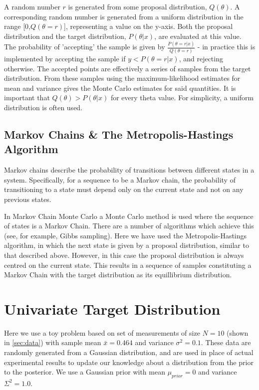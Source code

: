 \documentclass[a4paper,11pt,twoside]{article}
\begin{document}
A random number $r$ is generated from some proposal distribution, $Q(\theta)$. A
corresponding random number is generated from a uniform distribution in the
range [0,$Q(\theta = r)$], representing a value on the y-axis. Both the
proposal distribution and the target distribution, $P(\theta|x)$, are
evaluated at this value. The probability of 'accepting' the sample is given by
$\frac{P(\theta = r|x)}{Q(\theta = r)}$ - in practice this is implemented by accepting the
sample if $y < P(\theta = r|x)$, and rejecting otherwise. The accepted points are
effectively a series of samples from the target distribution. From these
samples using the maximum-likelihood estimates for mean and variance gives the
Monte Carlo estimates for said quantities. It is important that $Q(\theta) >
P(\theta|x)$ for every theta value. For simplicity, a uniform distribution is often used.

\subsection{Markov Chains \& The Metropolis-Hastings Algorithm}
Markov chains describe the probability of transitions between different states
in a system. Specifically, for a sequence to be a Markov chain, the
probability of transitioning to a state must depend only on the current state
and not on any previous states.

In Markov Chain Monte Carlo a Monte Carlo method is used where the sequence of
states is a Markov Chain. There are a number of algorithms which achieve this
(see, for example, Gibbs sampling).
Here we have used the Metropolis-Hastings algorithm, in which the next state is
given by a proposal distribution, similar to that described above. However,
in this case the proposal distribution is always centred on the current state.
This results in a sequence of samples constituting a Markov Chain with the
target distribution as its equillibrium distribution.

\section{Univariate Target Distribution}
Here we use a toy problem based on set of measurements of size $N = 10$ (shown
in \cref{sec:data}) with sample mean $\bar{x} = 0.464$ and variance $\sigma^2 =
0.1$.
These data are randomly generated from a Gaussian distribution, and are used in
place of actual experimental results to update our knowledge about a
distribution from the prior to the posterior. We use a Gaussian prior with mean
$\mu_{prior} = 0$ and variance $\Sigma^{2} = 1.0$.
\end{document}
